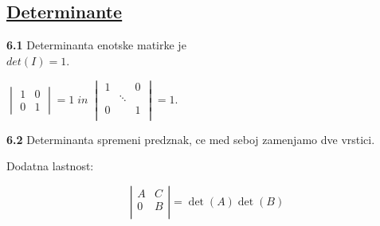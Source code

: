 \documentclass{article}
\begin{document}
\begin{multicols}{2}
	\section{\underline{Determinante}}

	\textbf{6.1} Determinanta enotske matirke je\\ $det(I) = 1$.
	\begin{center}
		\begin{math}
			\begin{vmatrix}
				1 & 0 \\
				0 & 1
			\end{vmatrix}
			= 1\; in\;
			\begin{vmatrix}
				1 &        & 0 \\
				  & \ddots &   \\
				0 &        & 1 \\
			\end{vmatrix}
			= 1.
		\end{math}
	\end{center}

	\textbf{6.2} Determinanta spremeni predznak, ce med seboj zamenjamo dve vrstici.

	Dodatna lastnost:

	\[
		\left| \begin{array}{cc}
			A & C \\
			0 & B \\
		\end{array} \right| = \det(A) \det(B)
	\]


\end{multicols}
\end{document}
